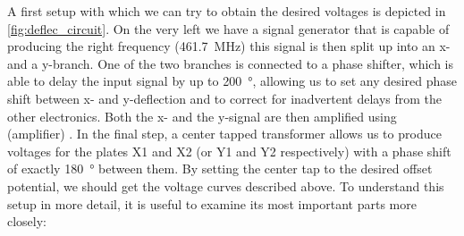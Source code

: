 A first setup with which we can try to obtain the desired voltages is depicted in \cref{fig:deflec_circuit}. On the  very left we have a signal generator that is capable of producing the right frequency (\SI{461.7}{\mega\hertz}) this signal is then split up into an x- and a y-branch. One of the two branches is connected to a phase shifter, which is able to delay the input signal by up to \SI{200}{\degree}, allowing us to set any desired phase shift between x- and y-deflection and to correct for inadvertent delays from the other electronics. Both the x- and the y-signal are then amplified using (amplifier) . In the final step, a center tapped transformer allows us to produce voltages for the plates X1 and X2 (or Y1 and Y2 respectively) with a phase shift of exactly \SI{180}{\degree} between them. By setting the center tap to the desired offset potential, we should get the voltage curves described above. To understand this setup in more detail, it is useful to examine its most important parts more closely:

